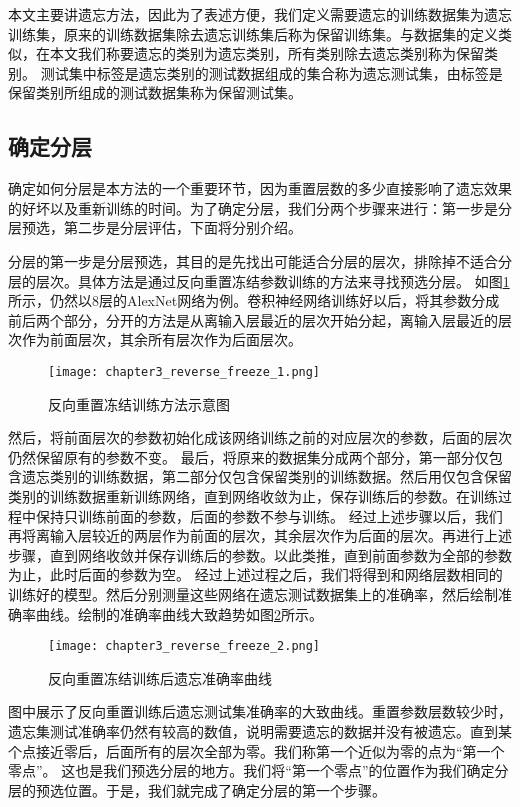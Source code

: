 本文主要讲遗忘方法，因此为了表述方便，我们定义需要遗忘的训练数据集为遗忘训练集，原来的训练数据集除去遗忘训练集后称为保留训练集。与数据集的定义类似，在本文我们称要遗忘的类别为遗忘类别，所有类别除去遗忘类别称为保留类别。
测试集中标签是遗忘类别的测试数据组成的集合称为遗忘测试集，由标签是保留类别所组成的测试数据集称为保留测试集。

\subsection{确定分层}
确定如何分层是本方法的一个重要环节，因为重置层数的多少直接影响了遗忘效果的好坏以及重新训练的时间。为了确定分层，我们分两个步骤来进行：第一步是分层预选，第二步是分层评估，下面将分别介绍。

分层的第一步是分层预选，其目的是先找出可能适合分层的层次，排除掉不适合分层的层次。具体方法是通过反向重置冻结参数训练的方法来寻找预选分层。
如图\ref{fig:chapter3_reverse_freeze_1}所示，仍然以8层的AlexNet网络为例。卷积神经网络训练好以后，将其参数分成前后两个部分，分开的方法是从离输入层最近的层次开始分起，离输入层最近的层次作为前面层次，其余所有层次作为后面层次。
\begin{figure}
    \centering
    \texttt{[image: chapter3\_reverse\_freeze\_1.png]}
    \caption{反向重置冻结训练方法示意图}
    \label{fig:chapter3_reverse_freeze_1}
\end{figure}
然后，将前面层次的参数初始化成该网络训练之前的对应层次的参数，后面的层次仍然保留原有的参数不变。
最后，将原来的数据集分成两个部分，第一部分仅包含遗忘类别的训练数据，第二部分仅包含保留类别的训练数据。然后用仅包含保留类别的训练数据重新训练网络，直到网络收敛为止，保存训练后的参数。在训练过程中保持只训练前面的参数，后面的参数不参与训练。
经过上述步骤以后，我们再将离输入层较近的两层作为前面的层次，其余层次作为后面的层次。再进行上述步骤，直到网络收敛并保存训练后的参数。以此类推，直到前面参数为全部的参数为止，此时后面的参数为空。
经过上述过程之后，我们将得到和网络层数相同的训练好的模型。然后分别测量这些网络在遗忘测试数据集上的准确率，然后绘制准确率曲线。绘制的准确率曲线大致趋势如图\ref{fig:chapter3_reverse_freeze_2}所示。
\begin{figure}
    \centering
    \texttt{[image: chapter3\_reverse\_freeze\_2.png]}
    \caption{反向重置冻结训练后遗忘准确率曲线}
    \label{fig:chapter3_reverse_freeze_2}
\end{figure}
图中展示了反向重置训练后遗忘测试集准确率的大致曲线。重置参数层数较少时，遗忘集测试准确率仍然有较高的数值，说明需要遗忘的数据并没有被遗忘。直到某个点接近零后，后面所有的层次全部为零。我们称第一个近似为零的点为“第一个零点”。
这也是我们预选分层的地方。我们将“第一个零点”的位置作为我们确定分层的预选位置。于是，我们就完成了确定分层的第一个步骤。

